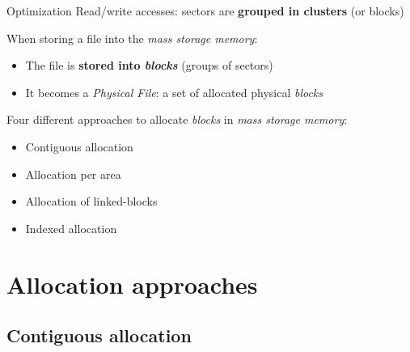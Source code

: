 \documentclass{beamer}[10pt, usepdftitle=false, handout]
\begin{document}
{\begin{frame}
\begin{center}
	\end{center}	
	
	\pause
	\begin{block}{Optimization}
	Read/write accesses: sectors are \textbf{grouped in clusters} (or blocks)
	\end{block}
	
	\end{frame}	
	
	\begin{frame}
	
	When storing a file into the \textit{mass storage memory}:
	\vspace*{1em}
	\begin{itemize}
	\item{The file is \textbf{stored into \textit{blocks}} (groups of sectors)}
	\item{It becomes a \textit{Physical File}: a set of allocated physical \textit{blocks}}	
	\end{itemize}		
	
	\vspace*{1em}	
	
	Four different approaches to allocate \textit{blocks} in \textit{mass storage memory}:
	\vspace*{0.5em}
	\begin{itemize}
	\item{Contiguous allocation}
	\item{Allocation per area}
	\item{Allocation of linked-blocks}
	\item{Indexed allocation}	
	\end{itemize}
		
	\end{frame}	
	
	\section{Allocation approaches}
	\subsection{Contiguous allocation}	
	
	\begin{frame}
	

\end{frame}}
\end{document}
